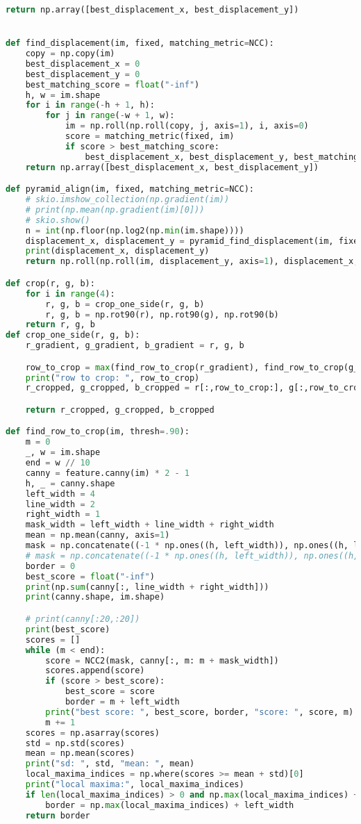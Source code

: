 \documentclass[withoutpreface,bwprint]{cumcmthesis} %
\begin{document}
\begin{appendices}
\begin{lstlisting}[language=python]
	return np.array([best_displacement_x, best_displacement_y])


def find_displacement(im, fixed, matching_metric=NCC):
	copy = np.copy(im)
	best_displacement_x = 0
	best_displacement_y = 0
	best_matching_score = float("-inf")
	h, w = im.shape
	for i in range(-h + 1, h):
		for j in range(-w + 1, w):
			im = np.roll(np.roll(copy, j, axis=1), i, axis=0)
			score = matching_metric(fixed, im)
			if score > best_matching_score:
				best_displacement_x, best_displacement_y, best_matching_score = i, j, score
	return np.array([best_displacement_x, best_displacement_y])

def pyramid_align(im, fixed, matching_metric=NCC):
	# skio.imshow_collection(np.gradient(im))
	# print(np.mean(np.gradient(im)[0]))
	# skio.show()
	n = int(np.floor(np.log2(np.min(im.shape))))
	displacement_x, displacement_y = pyramid_find_displacement(im, fixed, n, 1, matching_metric)
	print(displacement_x, displacement_y)
	return np.roll(np.roll(im, displacement_y, axis=1), displacement_x, axis=0)

def crop(r, g, b):
	for i in range(4):
		r, g, b = crop_one_side(r, g, b)
		r, g, b = np.rot90(r), np.rot90(g), np.rot90(b)
	return r, g, b
def crop_one_side(r, g, b):
	r_gradient, g_gradient, b_gradient = r, g, b

	row_to_crop = max(find_row_to_crop(r_gradient), find_row_to_crop(g_gradient), find_row_to_crop(b_gradient))
	print("row to crop: ", row_to_crop)
	r_cropped, g_cropped, b_cropped = r[:,row_to_crop:], g[:,row_to_crop:], b[:,row_to_crop:]

	return r_cropped, g_cropped, b_cropped

def find_row_to_crop(im, thresh=.90):
	m = 0
	_, w = im.shape
	end = w // 10
	canny = feature.canny(im) * 2 - 1
	h, _ = canny.shape
	left_width = 4
	line_width = 2
	right_width = 1
	mask_width = left_width + line_width + right_width
	mean = np.mean(canny, axis=1)
	mask = np.concatenate((-1 * np.ones((h, left_width)), np.ones((h, line_width)), -1 * np.ones((h, right_width))), axis=1)
	# mask = np.concatenate((-1 * np.ones((h, left_width)), np.ones((h, line_width)), -1 * np.ones((h, right_width))), axis=1)
	border = 0
	best_score = float("-inf")
	print(np.sum(canny[:, line_width + right_width]))
	print(canny.shape, im.shape)

	# print(canny[:20,:20])
	print(best_score)
	scores = []
	while (m < end):
		score = NCC2(mask, canny[:, m: m + mask_width])
		scores.append(score)
		if (score > best_score):
			best_score = score
			border = m + left_width
		print("best score: ", best_score, border, "score: ", score, m)
		m += 1
	scores = np.asarray(scores)
	std = np.std(scores)
	mean = np.mean(scores)
	print("sd: ", std, "mean: ", mean)
	local_maxima_indices = np.where(scores >= mean + std)[0]
	print("local maxima:", local_maxima_indices)
	if len(local_maxima_indices) > 0 and np.max(local_maxima_indices) + left_width > border:
		border = np.max(local_maxima_indices) + left_width
	return border


\end{lstlisting}
\end{appendices}
\end{document}
